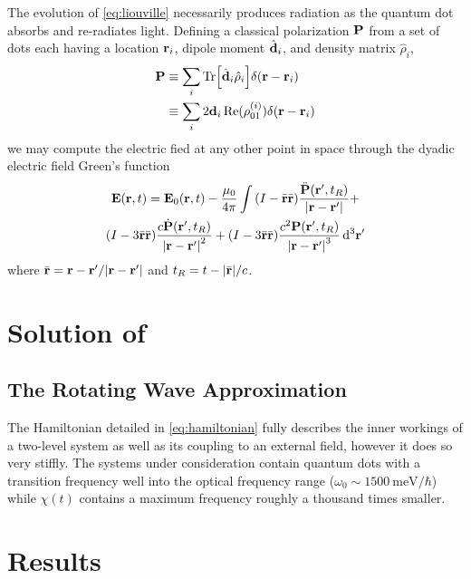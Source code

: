 \documentclass[conference]{IEEEtran}
\begin{document}
The evolution of \cref{eq:liouville} necessarily produces radiation as the quantum dot absorbs and re-radiates light.
Defining a classical polarization $\vb{P}$ from a set of dots each having a location $\vb{r}_i$, dipole moment $\hat{\vb{d}}_i$, and density matrix $\hat{\rho}_i$,
\begin{equation}
  \begin{aligned}
    \vb{P} & \equiv \sum_i \Tr[\hat{\vb{d}}_i \hat{\vb{\rho}}_i]\delta(\vb{r} - \vb{r}_i) \\
    & \equiv \sum_i 2\vb{d}_i \Re(\rho^{\qty(i)}_{01})\delta(\vb{r} - \vb{r}_i)
  \end{aligned}
  \label{eq:polarization}
\end{equation}
we may compute the electric fied at any other point in space through the dyadic electric field Green's function
\begin{equation}
  \begin{gathered}
  \vb{E}(\vb{r}, t) = \vb{E}_0(\vb{r}, t) - \frac{\mu_0}{4\pi} \int 
      \qty(I - \bar{\vb{r}}\bar{\vb{r}}) \frac{\ddot{\vb{P}}(\vb{r}', t_R)}{\abs{\vb{r} - \vb{r}'}} + \\ 
      \qty(I - 3\bar{\vb{r}}\bar{\vb{r}}) \frac{c \dot{\vb{P}}(\vb{r}', t_R)}{\abs{\vb{r} - \vb{r}'}^2} + 
      \qty(I - 3\bar{\vb{r}}\bar{\vb{r}}) \frac{c^2 \vb{P}(\vb{r}', t_R)}{\abs{\vb{r} - \vb{r}'}^3}  
  \dd[3]{\vb{r}'}
  \end{gathered}
\end{equation}
where $\bar{\vb{r}} = \vb{r} - \vb{r}'/\abs{\vb{r} - \vb{r}'}$ and $t_R = t - \abs{\bar{\vb{r}}}/c$.

\section{Solution of }
\subsection{The Rotating Wave Approximation}
The Hamiltonian detailed in \cref{eq:hamiltonian} fully describes the inner workings of a two-level system as well as its coupling to an external field, however it does so very stiffly. 
The systems under consideration contain quantum dots with a transition frequency well into the optical frequency range ($\omega_0 \sim \SI{1500}{\milli \eV}/\hbar$) while $\chi(t)$ contains a maximum frequency roughly a thousand times smaller. 


\section{Results}
\end{document}
